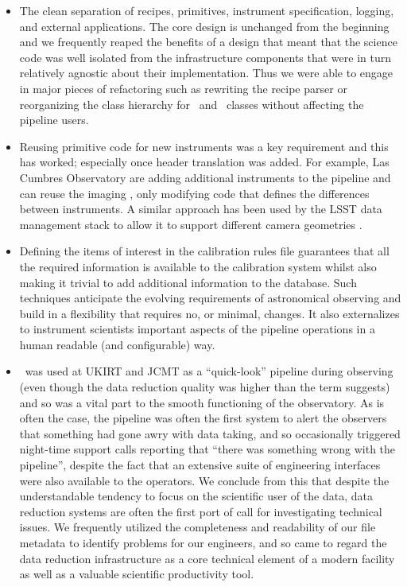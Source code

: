 \documentclass[final,authoryear,5p,times,twocolumn]{elsarticle}
\begin{document}
\begin{itemize}

\item The clean separation of recipes, primitives, instrument
  specification, logging, and external applications. The core design is
  unchanged from the beginning and we frequently reaped the benefits
  of a design that meant that the science code was well isolated from
  the infrastructure components that were in turn relatively agnostic
  about their implementation. Thus we were able to engage in major
  pieces of refactoring such as rewriting the recipe parser or
  reorganizing the class hierarchy for \Frame\ and \Group\ classes
  without affecting the pipeline users.

\item Reusing primitive code for new instruments was a key requirement
  and this has worked; especially once header translation was
  added. For example, Las Cumbres Observatory are adding additional
  instruments to the pipeline and can reuse the imaging \primitives,
  only modifying code that defines the differences between
  instruments. A similar approach has been used by the LSST data
  management stack to allow it to support different camera geometries
  \citep{2010SPIE.7740E..15A}.

\item Defining the items of interest in the calibration rules file
  guarantees that all the required information is available to the
  calibration system whilst also making it trivial to add additional
  information to the database. Such techniques anticipate the evolving
  requirements of astronomical observing and build in a flexibility
  that requires no, or minimal, changes. It also externalizes to
  instrument scientists important aspects of the pipeline operations
  in a human readable (and configurable) way.

\item \oracdr\ was used at UKIRT and JCMT as a ``quick-look'' pipeline
  during observing (even though the data reduction quality was higher
  than the term suggests) and so was a vital part to the smooth
  functioning of the observatory. As is often the case, the pipeline
  was often the first system to alert the observers that something had
  gone awry with data taking, and so occasionally triggered night-time
  support calls reporting that ``there was something wrong with the
  pipeline'', despite the fact that an extensive suite of engineering
  interfaces were also available to the operators. We conclude from
  this that despite the understandable tendency to focus on the
  scientific user of the data, data reduction systems are often the
  first port of call for investigating technical issues. We frequently
  utilized the completeness and readability of our file metadata to
  identify problems for our engineers, and so came to regard the data
  reduction infrastructure as a core technical element of a modern
  facility as well as a valuable scientific productivity tool.

\end{itemize}
\end{document}

